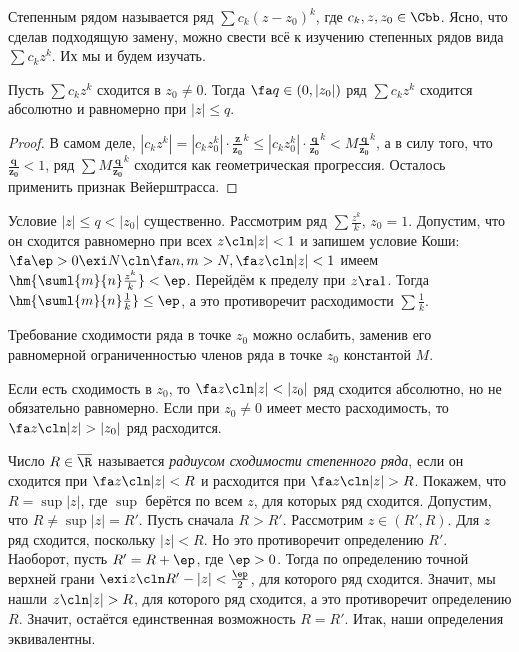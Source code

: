 \documentclass[a4paper]{article}
\begin{document}
Степенным рядом называется ряд $\sum c_k(z-z_0)^k$, где $c_k, z,z_0 \in \Cbb$. Ясно, что сделав подходящую замену,
можно свести всё к изучению степенных рядов вида $\sum c_kz^k$. Их мы и будем изучать.
\begin{theorem}
Пусть $\sum c_kz^k$ сходится в $z_0 \neq 0$. Тогда $\fa q \in (0, |z_0|)$ ряд $\sum c_kz^k$ сходится абсолютно и равномерно
при $|z| \le q$.
\end{theorem}
\begin{proof}
В самом деле, $|c_kz^k|=|c_kz_0^k|\cdot\bm{\frac{z}{z_0}} ^k \le |c_k z_0^k| \cdot \bm{\frac{q}{z_0}} ^k <
M\bm{\frac{q}{z_0}} ^k$, а в силу того, что $\bm{\frac{q}{z_0}} < 1$, ряд $\sum M \bm{\frac{q}{z_0}} ^k$
сходится как геометрическая прогрессия. Осталось применить признак Вейерштрасса.
\end{proof}

\begin{note}
Условие $|z| \le q < |z_0|$ существенно. Рассмотрим ряд $\sum \frac{z^k}{k}$, $z_0=1$.
Допустим, что он сходится равномерно при всех $z\cln |z|<1$ и запишем условие
Коши: $\fa \ep > 0 \exi N\cln \fa n,m>N, \fa z\cln |z| < 1$ имеем
$\hm{\suml{m}{n} \frac{z^k}{k}} < \ep$. Перейдём к пределу при $z \ra 1$. Тогда
$\hm{\suml{m}{n} \frac{1}{k}} \le \ep$, а
это противоречит расходимости $\sum \frac{1}{k}$.
\end{note}

\begin{note}
Требование сходимости ряда в точке $z_0$ можно ослабить, заменив его равномерной ограниченностью
членов ряда в точке $z_0$ константой $M$.
\end{note}

\begin{imp}
Если есть сходимость в $z_0$, то $\fa z\cln |z| < |z_0|$ ряд сходится абсолютно, но не обязательно равномерно.
Если при $z_0 \neq 0$ имеет место расходимость, то $\fa z\cln |z| > |z_0|$ ряд расходится.
\end{imp}

\begin{df}
Число $R \in \overline{\R}$ называется \emph{радиусом сходимости степенного ряда}, если он
сходится при $\fa z \cln |z| < R$ и расходится при
$\fa z\cln |z| > R$.
Покажем, что $R = \sup |z|$, где $\sup$ берётся по всем $z$, для которых ряд сходится.
Допустим, что $R \neq \sup |z| = R'$. Пусть сначала $R > R'$. Рассмотрим $z \in (R', R)$. Для
$z$ ряд сходится, поскольку $|z| < R$. Но это противоречит определению $R'$. Наоборот, пусть
$R'=R+\ep$, где $\ep > 0$. Тогда по определению точной верхней грани $\exi z\cln R'-|z| < \frac{\ep}{2}$, для
которого ряд сходится. Значит, мы нашли $z\cln |z| >R$, для которого ряд сходится, а это противоречит
определению $R$. Значит, остаётся единственная возможность $R=R'$. Итак, наши определения эквивалентны.
\end{df}
\end{document}
